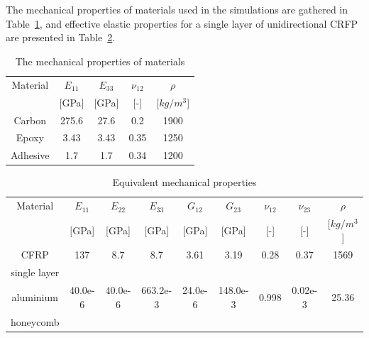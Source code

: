\documentclass[a4paper,12pt]{article}
\begin{document}
{\section{}
\label{app:properties}
The mechanical properties of materials used in the simulations are gathered in Table~\ref{tab:properties}, and effective elastic properties for a single layer of unidirectional CRFP are presented in Table~\ref{tab:properties_eff}.
\begin{table}
	\centering
	\caption{\label{tab:properties}The mechanical properties of materials}
	\begin{tabular}{ccccc}\hline
		Material & \(E_{11}\) &  \(E_{33}\) & \(\nu_{12}\) & \(\rho\) \\
		& [GPa] &  [GPa] & [-] & [\(kg/m^3\)]\\
		\hline
		Carbon & 275.6 & 27.6 & 0.2 & 1900\\
		Epoxy & 3.43 & 3.43 & 0.35 & 1250\\
		Adhesive & 1.7 & 1.7 & 0.34 & 1200\\
	\end{tabular}
\end{table}

\begin{table}
	\centering
	\caption{\label{tab:properties_eff} Equivalent mechanical properties}
	\begin{tabular}{ccccccccc}
		\hline
		Material & \(E_{11}\) & \(E_{22}\) & \(E_{33}\) & \(G_{12}\) & \(G_{23}\) & \(\nu_{12}\) 
		& \(\nu_{23}\) & \(\rho\) \\
		& \([\)GPa] & [GPa] & [GPa] & [GPa] & [GPa] & [-] & [-] & [\(kg/m^3\)]\\
		\hline
		CFRP & 137 & 8.7 & 8.7 & 3.61 & 3.19 & 0.28 & 0.37 & 1569\\
		single layer & & & & & & & &\\ \hline
		aluminium & 40.0e-6 & 40.0e-6 & 663.2e-3 & 24.0e-6 & 148.0e-3 & 0.998 & 0.02e-3 & 25.36\\
		honeycomb & & & & & & & &\\
		\hline
	\end{tabular}
\end{table}

}
\end{document}
